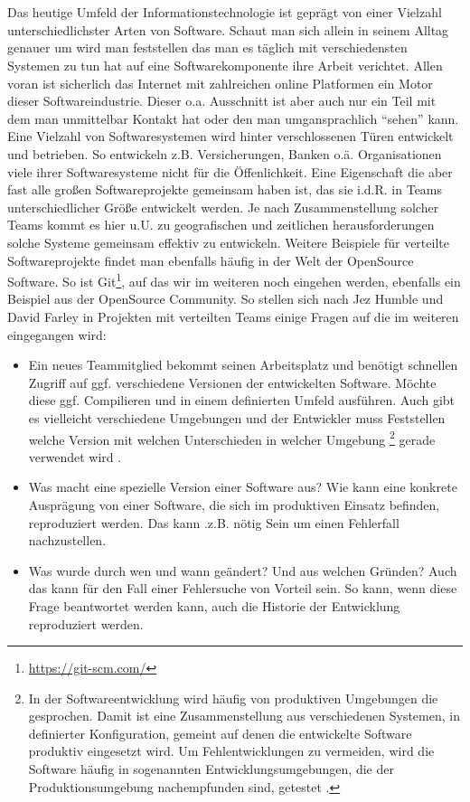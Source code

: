 \chapter{\preamble}
\label{cha:preamble}
Das heutige Umfeld der Informationstechnologie ist gepr\"agt von einer Vielzahl
unterschiedlichster Arten von Software. Schaut man sich allein in seinem Alltag
genauer um wird man feststellen das man es täglich mit verschiedensten Systemen
zu tun hat auf eine Softwarekomponente ihre Arbeit verichtet. Allen voran ist
sicherlich das Internet mit zahlreichen online Platformen ein Motor dieser
Softwareindustrie. Dieser o.a. Ausschnitt ist aber auch nur ein Teil mit dem
man unmittelbar Kontakt hat oder den man umgansprachlich "`sehen"' kann.  Eine
Vielzahl von Softwaresystemen wird hinter verschlossenen T\"uren entwickelt und
betrieben. So entwickeln z.B.  Versicherungen, Banken o.\"a.  Organisationen
viele ihrer Softwaresysteme nicht f\"ur die \"Offenlichkeit. Eine Eigenschaft
die aber fast alle gro\ss{}en Softwareprojekte gemeinsam haben ist, das sie
i.d.R. in Teams unterschiedlicher Gr\"o\ss{}e entwickelt werden. Je nach
Zusammenstellung solcher Teams kommt es hier u.U. zu geografischen und
zeitlichen herausforderungen solche Systeme gemeinsam effektiv zu entwickeln.
Weitere Beispiele f\"ur verteilte Softwareprojekte findet man ebenfalls
h\"aufig in der Welt der \gls{OpenSource} Software. So ist
Git\footnote{\label{git:1}\url{https://git-scm.com/}}, auf das wir im weiteren noch
eingehen werden, ebenfalls ein Beispiel aus der \gls{OpenSource} Community. So
stellen sich nach Jez Humble und David Farley in Projekten mit verteilten Teams einige Fragen auf die im weiteren eingegangen wird\cite[S.~26, 33]{cd}:
\begin{itemize}
  \item Ein neues Teammitglied bekommt seinen Arbeitsplatz und ben\"otigt
  schnellen Zugriff auf ggf. verschiedene Versionen der entwickelten Software.
  M\"ochte diese ggf. Compilieren und in einem definierten Umfeld ausf\"uhren.
  Auch gibt es vielleicht verschiedene Umgebungen und der Entwickler muss
  Feststellen welche Version mit welchen Unterschieden in welcher \gls{Umgebung}
  \footnote{\label{umgebung:1}In der Softwareentwicklung wird häufig von
  produktiven Umgebungen die gesprochen.  Damit ist eine Zusammenstellung aus
  verschiedenen Systemen, in definierter Konfiguration, gemeint auf denen die
  entwickelte Software produktiv eingesetzt wird. Um Fehlentwicklungen zu
  vermeiden, wird die Software häufig in sogenannten Entwicklungsumgebungen,
  die der Produktionsumgebung nachempfunden sind, getestet \cite[s.~49,
  250]{cd}.} gerade verwendet wird \citep[s.~26]{cd}.
  \item Was macht eine spezielle Version einer Software aus?  Wie kann eine
  konkrete Auspr\"agung von einer Software, die sich im produktiven Einsatz
  befinden, reproduziert werden. Das kann .z.B. n\"otig Sein um einen
  Fehlerfall nachzustellen\cite[s.~33]{cd}.
  \item Was wurde durch wen und wann ge\"andert? Und aus welchen Gr\"unden?
  Auch das kann f\"ur den Fall einer Fehlersuche von Vorteil sein. So kann,
  wenn diese Frage beantwortet werden kann, auch die Historie der Entwicklung
  reproduziert werden\cite[s.~33]{cd}.
\end{itemize}
